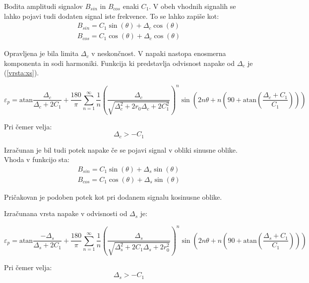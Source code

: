 Bodita amplitudi signalov $B_{sin}$ in $B_{cos}$ enaki $C_1$. V obeh vhodnih signalih se lahko pojavi tudi dodaten signal iste frekvence. To se lahko zapiše kot:
\begin{eqnarray}
\label{xs_analit}
B_{sin} = C_1 \sin(\theta) + \Delta_c \cos(\theta) \\
B_{cos} = C_1 \cos(\theta) + \Delta_c \cos(\theta)
\end{eqnarray}

Opravljena je bila limita $\Delta_c$ v neskončnost. V napaki nastopa enosmerna komponenta in sodi harmoniki. Funkcija ki predstavlja odvisnost napake od $\Delta_c$ je (\ref{vrsta:xs}).

 \begin{equation}
 \label{vrsta:xs}
 \varepsilon_p = \mathrm{atan}\frac{\Delta_c}{\Delta_c+2C_1}+\frac{180}{\pi} \sum_{n=1}^{\infty}\frac{1}{n} (\frac{\Delta_c}{\sqrt{\Delta_c^2+2 r_0\Delta_c+2C_1^2}})^n \sin (2n \theta+n (90+ \mathrm{ atan}(\frac{\Delta_c+C_1}{C_1})))
 \end{equation}
 
 Pri čemer velja:
 $$\Delta_c > -C_1$$

Izračunan je bil tudi potek napake če se pojavi signal v obliki sinusne oblike. Vhoda v funkcijo sta:
\begin{eqnarray}
\label{ys_analit}
B_{sin} = C_1 \sin(\theta) + \Delta_s \sin(\theta) \\
B_{cos} = C_1 \cos(\theta) + \Delta_s \sin(\theta)
\end{eqnarray}

Pričakovan je podoben potek kot pri dodanem signalu kosinusne oblike.
 
Izračunana vrsta napake v odvisnosti od  $\Delta_s$ je:
 
  \begin{equation}
   \label{vrsta:ys}
 \varepsilon_p = \mathrm{atan}\frac{-\Delta_s}{\Delta_s+2C_1}+\frac{180}{\pi} \sum_{n=1}^{\infty}\frac{1}{n} (\frac{\Delta_s}{\sqrt{\Delta_s^2+2 C_1 \Delta_s+2r_0^2}})^n \sin (2n \theta+n (90+ \mathrm{ atan}(\frac{\Delta_s+C_1}{C_1})))
 \end{equation}

 Pri čemer velja:
$$\Delta_s > -C_1$$

%
%
%
%

